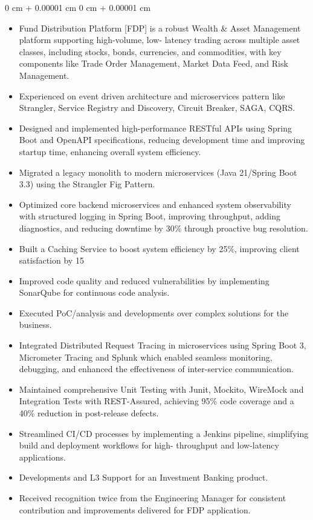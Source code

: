 \documentclass[10pt, letterpaper]{article}
\newenvironment{highlights}{
    \begin{itemize}[
        topsep=0.10 cm,
        parsep=0.10 cm,
        partopsep=0pt,
        itemsep=0pt,
        leftmargin=0 cm + 10pt
    ]
}{
    \end{itemize}
} %
\newenvironment{onecolentry}{
    \begin{adjustwidth}{
        0 cm + 0.00001 cm
    }{
        0 cm + 0.00001 cm
    }
}{
    \end{adjustwidth}
} %
\begin{document}
        \vspace{0.10 cm}
        \begin{onecolentry}
            \begin{highlights}
                \item Fund Distribution Platform [FDP] is a robust Wealth \& Asset Management platform supporting high-volume, low- latency trading across multiple asset classes, including stocks, bonds, currencies, and commodities, with key components like Trade Order Management, Market Data Feed, and Risk Management.
                \item Experienced on event driven architecture and microservices pattern like Strangler, Service Registry and Discovery, Circuit Breaker, SAGA, CQRS.
                \item Designed and implemented high-performance RESTful APIs using Spring Boot and OpenAPI specifications, reducing development time and improving startup time, enhancing overall system efficiency.
                \item Migrated a legacy monolith to modern microservices (Java 21/Spring Boot 3.3) using the Strangler Fig Pattern.
                \item Optimized core backend microservices and enhanced system observability with structured logging in Spring Boot, improving throughput, adding diagnostics, and reducing downtime by 30\% through proactive bug resolution.
                \item Built a Caching Service to boost system efficiency by 25\%, improving client satisfaction by 15%
                \item Improved code quality and reduced vulnerabilities by implementing SonarQube for continuous code analysis.
                \item Executed PoC/analysis and developments over complex solutions for the business.
                \item Integrated Distributed Request Tracing in microservices using Spring Boot 3, Micrometer Tracing and Splunk which enabled seamless monitoring, debugging, and enhanced the effectiveness of inter-service communication.
                \item Maintained comprehensive Unit Testing with Junit, Mockito, WireMock and Integration Tests with REST-Assured, achieving 95\% code coverage and a 40\% reduction in post-release defects.
                \item Streamlined CI/CD processes by implementing a Jenkins pipeline, simplifying build and deployment workflows for high- throughput and low-latency applications.
                \item Developments and L3 Support for an Investment Banking product.
                \item Received recognition twice from the Engineering Manager for consistent contribution and improvements delivered for FDP application.

            \end{highlights}
        \end{onecolentry}
\end{document}
